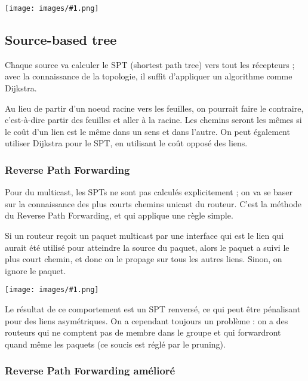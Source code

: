 \documentclass[10pt,a4paper]{report}
\newcommand{\dessin}[1]{\begin{center}\texttt{[image: images/\#1.png]}\end{center}}
\begin{document}
	\dessin{130}
	
		\subsection{Source-based tree}
		
		
		Chaque source va calculer le SPT (shortest path tree) vers tout les récepteurs ; avec la connaissance de la topologie, il suffit d'appliquer un algorithme comme Dijkstra.
		
		Au lieu de partir d'un noeud racine vers les feuilles, on pourrait faire le contraire, c'est-à-dire partir des feuilles et aller à la racine. Les chemins seront les mêmes si le coût d'un lien est le même dans un sens et dans l'autre. On peut également utiliser Dijkstra pour le SPT, en utilisant le coût opposé des liens.
		
		
			\subsubsection{Reverse Path Forwarding}
			
			Pour du multicast, les SPTs ne sont pas calculés explicitement ; on va se baser sur la connaissance des plus courts chemins unicast du routeur. C'est la méthode du Reverse Path Forwarding, et qui applique une règle simple.
			
		
			Si un routeur reçoit un paquet multicast par une interface qui est le lien qui aurait été utilisé pour atteindre la source du paquet, alors le paquet a suivi le plus court chemin, et donc on le propage sur tous les autres liens. Sinon, on ignore le paquet.
			
			\dessin{133}
			
			Le résultat de ce comportement est un SPT renversé, ce qui peut être pénalisant pour des liens asymétriques. On a cependant toujours un problème : on a des routeurs qui ne comptent pas de membre dans le groupe et qui forwardront quand même les paquets (ce soucis est réglé par le pruning).
			
			\subsubsection{Reverse Path Forwarding amélioré}
			
\end{document}

